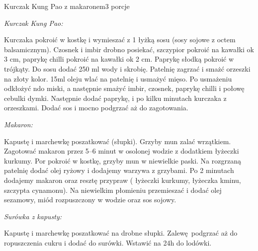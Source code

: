 \documentclass[a4paper,12pt]{article}
\begin{document}
\newpage

\begin{recipe}{Kurczak Kung Pao z makaronem}{3 porcje}{}
\freeform%
\begin{center}
\textit{Kurczak Kung Pao:}
\end{center}

Kurczaka pokroić w kostkę i wymieszać z 1 łyżką sosu (sosy sojowe z octem balsamicznym). Czosnek i imbir drobno posiekać, szczypior pokroić na kawałki ok 3 cm, paprykę chilli pokroić na kawałki ok 2 cm. 
Paprykę słodką pokroić w trójkąty. Do sosu dodać 250 ml wody i skrobię. Patelnię zagrzać i smażć orzeszki na złoty kolor. 15ml oleju wlać na patelnię i usmażyć mięso.
\freeform%
Po usmażeniu odkłożyć ndo miski, a następnie smażyć imbir, czosnek, paprykę chilli i połowę cebulki dymki. Następnie dodać paprykę, i po kilku minutach kurczaka z orzeszkami. Dodać sos i mocno podgrzać aż do zagotowania.

\begin{center}
\textit{Makaron:}
\end{center}
Kapustę i marchewkę poszatkować (słupki). Grzyby mun zalać wrzątkiem. Zagotować makaron przez 5--6 minut w osolonej wodzie z dodatkiem  łyżeczki kurkumy.
Por pokroić w kostkę, grzyby mun w niewielkie paski. Na rozgrzaną patelnię dodać olej ryżowy i dodajemy warzywa z grzybami.
Po 2 minutach dodajemy makaron oraz resztę przypraw ( łyżeczki kurkumy, łyżeczka kminu, szczypta cynamonu). Na niewielkim płomieniu przemieszać i dodać olej sezamowy, miód rozpuszczony w wodzie oraz sos sojowy.

\newpage

\freeform%
\begin{center}
\textit{Surówka z kapusty:}
\end{center}

Kapustę i marchewkę poszatkować na drobne słupki. Zalewę podgrzać aż do ropuszczenia cukru i dodać do surówki. Wstawić na 24h do lodówki.

\end{recipe}
\end{document}
